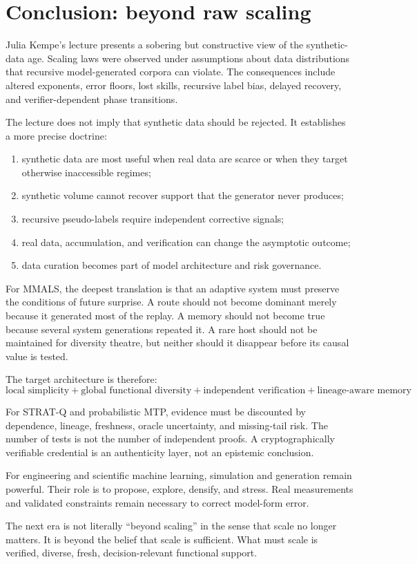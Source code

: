 \section{Conclusion: beyond raw scaling}

Julia Kempe's lecture presents a sobering but constructive view of the synthetic-data age. Scaling laws were observed under assumptions about data distributions that recursive model-generated corpora can violate. The consequences include altered exponents, error floors, lost skills, recursive label bias, delayed recovery, and verifier-dependent phase transitions.

The lecture does not imply that synthetic data should be rejected. It establishes a more precise doctrine:

\begin{enumerate}[leftmargin=*]
  \item synthetic data are most useful when real data are scarce or when they target otherwise inaccessible regimes;
  \item synthetic volume cannot recover support that the generator never produces;
  \item recursive pseudo-labels require independent corrective signals;
  \item real data, accumulation, and verification can change the asymptotic outcome;
  \item data curation becomes part of model architecture and risk governance.
\end{enumerate}

For MMALS, the deepest translation is that an adaptive system must preserve the conditions of future surprise. A route should not become dominant merely because it generated most of the replay. A memory should not become true because several system generations repeated it. A rare host should not be maintained for diversity theatre, but neither should it disappear before its causal value is tested.

The target architecture is therefore:
\[
\boxed{
\text{local simplicity}
+\text{global functional diversity}
+\text{independent verification}
+\text{lineage-aware memory}
}
\]

For STRAT-Q and probabilistic MTP, evidence must be discounted by dependence, lineage, freshness, oracle uncertainty, and missing-tail risk. The number of tests is not the number of independent proofs. A cryptographically verifiable credential is an authenticity layer, not an epistemic conclusion.

For engineering and scientific machine learning, simulation and generation remain powerful. Their role is to propose, explore, densify, and stress. Real measurements and validated constraints remain necessary to correct model-form error.

\begin{keyidea}
The next era is not literally ``beyond scaling'' in the sense that scale no longer matters. It is beyond the belief that scale is sufficient. What must scale is verified, diverse, fresh, decision-relevant functional support.
\end{keyidea}
